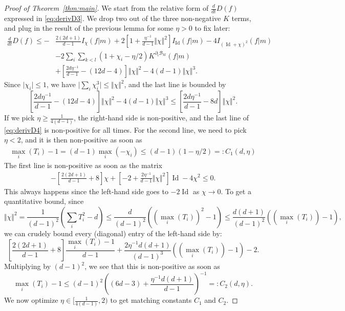 \documentclass[10pt,a4paper]{amsart}
\DeclareMathOperator*{\Id}{Id}
\begin{document}
\begin{proof}[Proof of Theorem~\ref{thm:main}]
We start from the relative form of $\frac{d}{dt}D(f)$ expressed in \eqref{eq:derivD3}. We drop two out of the three non-negative $K$ terms, and plug in the result of the previous lemma for some $\eta>0$ to fix later:
\begin{align}
\label{eq:derivD4}
    \frac{d}{dt}D(f)
    \leq-&\frac{2(2d+1)}{d-1}I_\chi(f\vert m)+2\left[1+\frac{\eta^{-1}}{d-1}\Vert \chi\Vert^2\right]I_{\Id}(f\vert m)-4I_{(\Id +\chi)^2}(f\vert m) \\
    &-2\sum_i\sum_{k<l}(1+\chi_i-\eta/2)K^{\partial_i\mathcal{B}_{kl} }(f\vert m)\nonumber\\
    &+\left[\frac{2d\eta^{-1}}{d-1}-(12d-4)\right]\Vert \chi\Vert^2-4(d-1)\Vert \chi\Vert^3\nonumber.
\end{align}
Since $\vert \chi_i\vert\leq 1$, we have $\vert \sum_i \chi_i^3 \vert \leq \Vert \chi\Vert^2$, and the last line is bounded by
$$\left[\frac{2d\eta^{-1}}{d-1}-(12d-4)\right]\Vert \chi\Vert^2-4(d-1)\Vert \chi\Vert^3 \leq \left[\frac{2d\eta^{-1}}{d-1}-8d\right]\Vert \chi\Vert^2.$$
If we pick $\eta\geq \frac{1}{4(d-1)}$, the right-hand side is non-positive, and the last line of \eqref{eq:derivD4} is non-positive for all times. For the second line, we need to pick $\eta<2$, and it is then non-positive as soon as
\begin{align*}
    \max_i(T_i)-1=(d-1)\max_i(-\chi_i)\leq (d-1)(1-\eta /2)=:C_1(d,\eta)
\end{align*}
The first line is non-positive as soon as the matrix
\begin{align*}
    -\left[\frac{2(2d+1)}{d-1}+
    8\right]\chi +\left[-2+\frac{2\eta^{-1}}{d-1}\Vert \chi\Vert^2\right] \Id -4\chi^2\leq 0.
\end{align*}
This always happens since the left-hand side goes to $-2\Id$ as $\chi\rightarrow 0$. To get a quantitative bound, since $$\Vert\chi\Vert^2=\frac{1}{(d-1)^2}\left(\sum_i T_i^2-d\right)\leq \frac{d}{(d-1)^2}\left((\max_i(T_i))^2-1\right)\leq \frac{d(d+1)}{(d-1)^2}\left((\max_i(T_i))-1\right),$$ we can crudely bound every (diagonal) entry of the left-hand side by:
$$ \left[\frac{2(2d+1)}{d-1}+
    8\right]\frac{\max_i(T_i)-1}{d-1} +\frac{2\eta^{-1}d(d+1)}{(d-1)^3}\left( (\max_i(T_i))-1\right)-2.$$
Multiplying by $(d-1)^2$, we see that this is non-positive as soon as
$$\max_i(T_i)-1\leq (d-1)^2\left((6d-3)+\frac{\eta^{-1}d(d+1)}{d-1}\right)^{-1} =:C_2(d,\eta).$$
We now optimize $\eta\in[\frac{1}{4(d-1)},2)$ to get matching constants $C_1$ and $C_2$.

\end{proof}
\end{document}
